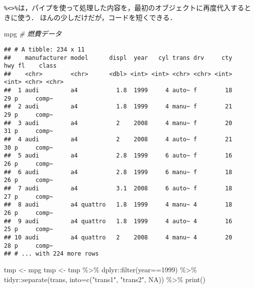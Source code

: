 \documentclass[
]{article}
\newenvironment{Shaded}{\begin{snugshade}}{\end{snugshade}}
\newcommand{\AttributeTok}[1]{\textcolor[rgb]{0.77,0.63,0.00}{#1}}
\newcommand{\CommentTok}[1]{\textcolor[rgb]{0.56,0.35,0.01}{\textit{#1}}}
\newcommand{\ConstantTok}[1]{\textcolor[rgb]{0.00,0.00,0.00}{#1}}
\newcommand{\DecValTok}[1]{\textcolor[rgb]{0.00,0.00,0.81}{#1}}
\newcommand{\FunctionTok}[1]{\textcolor[rgb]{0.00,0.00,0.00}{#1}}
\newcommand{\NormalTok}[1]{#1}
\newcommand{\OtherTok}[1]{\textcolor[rgb]{0.56,0.35,0.01}{#1}}
\newcommand{\SpecialCharTok}[1]{\textcolor[rgb]{0.00,0.00,0.00}{#1}}
\newcommand{\StringTok}[1]{\textcolor[rgb]{0.31,0.60,0.02}{#1}}
\begin{document}
\texttt{\%\textless{}\textgreater{}\%}は，パイプを使って処理した内容を，最初のオブジェクトに再度代入するときに使う．
ほんの少しだけだが，コードを短くできる．

\begin{Shaded}
\begin{Highlighting}[]
\NormalTok{mpg }\CommentTok{\# 燃費データ}
\end{Highlighting}
\end{Shaded}

\begin{verbatim}
## # A tibble: 234 x 11
##    manufacturer model      displ  year   cyl trans drv     cty   hwy fl    class
##    <chr>        <chr>      <dbl> <int> <int> <chr> <chr> <int> <int> <chr> <chr>
##  1 audi         a4           1.8  1999     4 auto~ f        18    29 p     comp~
##  2 audi         a4           1.8  1999     4 manu~ f        21    29 p     comp~
##  3 audi         a4           2    2008     4 manu~ f        20    31 p     comp~
##  4 audi         a4           2    2008     4 auto~ f        21    30 p     comp~
##  5 audi         a4           2.8  1999     6 auto~ f        16    26 p     comp~
##  6 audi         a4           2.8  1999     6 manu~ f        18    26 p     comp~
##  7 audi         a4           3.1  2008     6 auto~ f        18    27 p     comp~
##  8 audi         a4 quattro   1.8  1999     4 manu~ 4        18    26 p     comp~
##  9 audi         a4 quattro   1.8  1999     4 auto~ 4        16    25 p     comp~
## 10 audi         a4 quattro   2    2008     4 manu~ 4        20    28 p     comp~
## # ... with 224 more rows
\end{verbatim}

\begin{Shaded}
\begin{Highlighting}[]
\NormalTok{tmp }\OtherTok{\textless{}{-}}\NormalTok{ mpg}
\NormalTok{tmp }\OtherTok{\textless{}{-}}
\NormalTok{  tmp }\SpecialCharTok{\%\textgreater{}\%}
\NormalTok{  dplyr}\SpecialCharTok{::}\FunctionTok{filter}\NormalTok{(year}\SpecialCharTok{==}\DecValTok{1999}\NormalTok{) }\SpecialCharTok{\%\textgreater{}\%}
\NormalTok{  tidyr}\SpecialCharTok{::}\FunctionTok{separate}\NormalTok{(trans, }\AttributeTok{into=}\FunctionTok{c}\NormalTok{(}\StringTok{"trans1"}\NormalTok{, }\StringTok{"trans2"}\NormalTok{, }\ConstantTok{NA}\NormalTok{)) }\SpecialCharTok{\%\textgreater{}\%}
  \FunctionTok{print}\NormalTok{()}
\end{Highlighting}
\end{Shaded}
\end{document}
